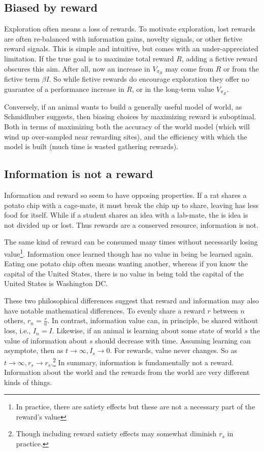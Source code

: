 \documentclass[9pt,twocolumn,twoside]{pnas-new}
\begin{document}
\subsection*{Biased by reward}
Exploration often means a loss of rewards. To motivate exploration, lost rewards are often re-balanced with information gains, novelty signals, or other fictive reward signals. This is simple and intuitive, but comes with an under-appreciated limitation. If the true goal is to maximize total reward $R$, adding a fictive reward obscures this aim. After all, now an increase in $V_{\pi_R}$ may come from $R$ or from the fictive term $\beta I$. So while fictive rewards do encourage exploration they offer no guarantee of a performance increase in $R$, or in the long-term value $V_{\pi_R}$. 

Conversely, if an animal wants to build a generally useful model of world, as Schmidhuber suggests, then biasing choices by maximizing reward is suboptimal. Both in terms of maximizing both the accuracy of the world model (which will wind up over-sampled near rewarding sites), and the efficiency with which the model is built (much time is wasted gathering rewards). 

\subsection*{Information is not a reward}
Information and reward so seem to have opposing properties. If a rat shares a potato chip with a cage-mate, it must break the chip up to share, leaving has less food for itself. While if a student shares an idea with a lab-mate, the is idea is not divided up or lost. Thus rewards are a conserved resource, information is not. 

The same kind of reward can be consumed many times without necessarily losing value\footnote{In practice, there are satiety effects but these are not a necessary part of the reward's value}. Information once learned though has no value in being be learned again. Eating one potato chip often means wanting another, whereas if you know the capital of the United States, there is no value in being told the capital of the United States is Washington DC.

These two philosophical differences suggest that reward and information may also have notable mathematical differences. To evenly share a reward $r$ between $n$ others, $r_n = \frac{r}{n}$. In contrast, information value can, in principle, be shared without loss, i.e., $I_n = I$. Likewise, if an animal is learning about some state of world $s$ the value of information about $s$ should decrease with time. Assuming learning can asymptote, then as $t \rightarrow \infty, I_s \rightarrow 0$. For rewards, value never changes. So as $t \rightarrow \infty, r_s \rightarrow r_s$.\footnote{Though including reward satiety effects may somewhat diminish $r_s$ in practice.} In summary, information is fundamentally not a reward. Information about the world and the rewards from the world are very different kinds of things.
\end{document}
